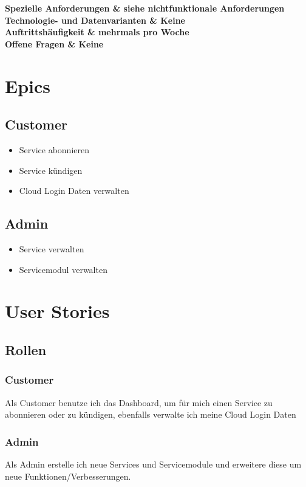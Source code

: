 \documentclass[11pt]{scrartcl}
\begin{document}
\begin{longtabu}
	\bfseries Spezielle Anforderungen & siehe nichtfunktionale Anforderungen  \\\hline 
	\bfseries Technologie- und Datenvarianten & Keine  \\\hline 
	\bfseries Auftrittshäufigkeit & mehrmals pro Woche  \\\hline 
	\bfseries Offene Fragen & Keine  \\\hline  
\end{longtabu}


\newpage
\section{Epics}
\subsection{Customer}
\begin{itemize}
  \item Service abonnieren
  \item Service kündigen
  \item Cloud Login Daten verwalten
\end{itemize}
\subsection{Admin}
\begin{itemize}
  \item Service verwalten
  \item Servicemodul verwalten
\end{itemize}
\section{User Stories}
\subsection{Rollen}
\subsubsection{Customer}
Als Customer benutze ich das Dashboard, um für mich einen Service zu abonnieren oder zu 
kündigen, ebenfalls verwalte ich meine Cloud Login Daten
\subsubsection{Admin}
Als Admin erstelle ich neue Services und Servicemodule und erweitere diese um 
neue Funktionen/Verbesserungen.
\end{document}
